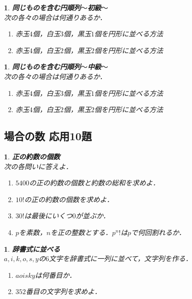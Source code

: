 \documentclass[10pt,
fleqn,
dvipdfmx,
uplatex
]{jsarticle}
\newtheorem{question}[Question]{}
\begin{document}
\begin{question}{\bf\boldmath 同じものを含む円順列$〜$初級$〜$}\\
次の各々の場合は何通りあるか．
\begin{enumerate}
\item 赤玉$4$個，白玉$3$個，黒玉$1$個を円形に並べる方法
\item 赤玉$4$個，白玉$2$個，黒玉$2$個を円形に並べる方法
\end{enumerate}

\end{question}



\begin{question}{\bf\boldmath 同じものを含む円順列$〜$中級$〜$}\\
次の各々の場合は何通りあるか．
\begin{enumerate}
\item 赤玉$4$個，白玉$3$個，黒玉$1$個を円形に並べる方法
\item 赤玉$4$個，白玉$2$個，黒玉$2$個を円形に並べる方法
\end{enumerate}

\end{question}

\subsection{場合の数 応用10題}



\begin{question}{\bf\boldmath 正の約数の個数}\\
次の各問いに答えよ．
\begin{enumerate}
\item ${5400}$の正の約数の個数と約数の総和を求めよ．
\item ${10}!$の正の約数の個数を求めよ．
\item ${30}!$は最後にいくつ$0$が並ぶか．
\item $p$を素数，$n$を正の整数とする．$p^n!$は$p$で何回割れるか．
\end{enumerate}

\end{question}



\begin{question}{\bf\boldmath 辞書式に並べる}\\
$a, i, k, o, s, y$の$6$文字を辞書式に一列に並べて，文字列を作る．
\begin{enumerate}
\item $aoisky$は何番目か．
\item ${352}$番目の文字列を求めよ．
\end{enumerate}

\end{question}
\end{document}
